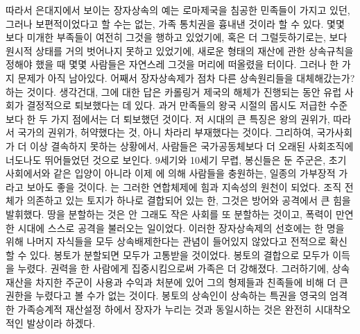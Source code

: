 따라서
은대지에서 보이는 장자상속의 예는
로마제국을 침공한 민족들이 가지고 있던, 그러나 보편적이었다고 할 수는 없는,
가족 통치권을 흉내낸 것이라 할 수 있다.
몇몇 보다 미개한 부족들이 여전히 그것을 행하고 있었기에,
혹은 더 그럴듯하기로는, 보다 원시적 상태를 거의 벗어나지 못하고 있었기에,
새로운 형태의 재산에 관한 상속규칙을 정해야 했을 때
몇몇 사람들은 자연스레 그것을 머리에 떠올렸을 터이다.
그러나 한 가지 문제가 아직 남아있다.
어째서 장자상속제가 점차 다른 상속원리들을 대체해갔는가? 하는 것이다.
생각건대, 그에 대한 답은
카롤링거 제국의 해체가 진행되는 동안 유럽 사회가 결정적으로 퇴보했다는 데 있다.
과거 만족들의 왕국 시절의
몹시도 저급한 수준보다 한 두 가지 점에서는 더 퇴보했던 것이다.
저 시대의 큰 특징은 왕의 권위가, 따라서 국가의 권위가,
허약했다는 것, 아니 차라리 부재했다는 것이다.
그리하여, 국가사회가 더 이상 결속하지 못하는 상황에서,
사람들은
국가공동체보다 더 오래된 사회조직에
너도나도 뛰어들었던 것으로 보인다.
9세기와 10세기 무렵, 봉신들은 둔 주군은,
초기 사회에서와 같은 입양이 아니라
이제 에 의해 사람들을 충원하는,
일종의 가부장적 가라고 보아도 좋을 것이다.
는
그러한 연합체제에
힘과 지속성의 원천이 되었다.
조직 전체가 의존하고 있는 토지가 하나로 결합되어 있는 한,
그것은 방어와 공격에서 큰 힘을 발휘했다.
땅을 분할하는 것은 안 그래도 작은 사회를 또 분할하는 것이고,
폭력이 만연한 시대에 스스로 공격을 불러오는 일이었다.
이러한 장자상속제의 선호에는
한 명을 위해 나머지 자식들을 모두 상속배제한다는 관념이
들어있지 않았다고
전적으로 확신할 수 있다.
봉토가 분할되면 모두가 고통받을 것이었다.
봉토의 결합으로 모두가 이득을 누렸다.
권력을 한 사람에게 집중시킴으로써 가족은 더 강해졌다.
그러하기에, 상속재산을 차지한 주군이
사용과 수익과 처분에 있어
그의 형제들과 친족들에 비해
더 큰 권한을 누렸다고 볼 수가 없는 것이다.
봉토의 상속인이 상속하는 특권을
영국의 엄격한 가족승계적 재산설정 하에서 장자가 누리는 것과
동일시하는 것은 완전히 시대착오적인 발상이라 하겠다.

